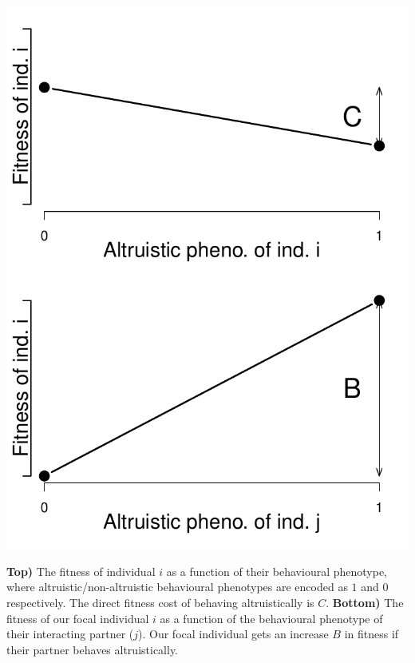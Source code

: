 \begin{marginfigure}
\begin{center}
\includegraphics[width= \textwidth]{figures/Response_to_sel/Hamiltons_rule_B_C.pdf}
\end{center}
\caption{{\bf Top)} The fitness of individual $i$ as a function of
  their behavioural phenotype, where altruistic/non-altruistic
  behavioural phenotypes are encoded as $1$ and $0$ respectively. The
  direct fitness cost of behaving altruistically is $C$. {\bf Bottom)}
  The fitness of our focal individual $i$ as a function of the
  behavioural phenotype of their interacting partner ($j$). Our focal
  individual gets an increase $B$ in fitness if their partner behaves
  altruistically. } \label{fig:Hamilton_B_C}
\end{marginfigure}


